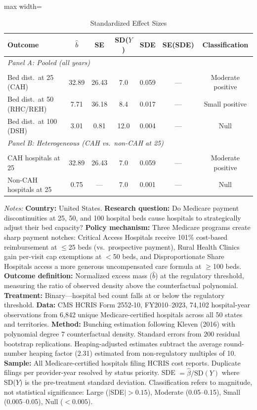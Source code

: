 \begin{table}[htbp]
\centering
\caption{Standardized Effect Sizes}
\label{tab:sde}
\begin{adjustbox}{max width=\textwidth}
\begin{tabular}{lcccccc}
\hline\hline
Outcome & $\hat{b}$ & SE & SD($Y$) & SDE & SE(SDE) & Classification \\
\hline
\multicolumn{7}{l}{\textit{Panel A: Pooled (all years)}} \\ &  &  &  &  &  &  \\
Bed dist.\ at 25 (CAH) & 32.89 & 26.43 & 7.0 & 0.059 & --- & Moderate positive \\
Bed dist.\ at 50 (RHC/REH) & 7.71 & 36.18 & 8.4 & 0.017 & --- & Small positive \\
Bed dist.\ at 100 (DSH) & 3.01 & 0.81 & 12.0 & 0.004 & --- & Null \\
\multicolumn{7}{l}{\textit{Panel B: Heterogeneous (CAH vs.\ non-CAH at 25)}} \\ &  &  &  &  &  &  \\
CAH hospitals at 25 & 32.89 & 26.43 & 7.0 & 0.059 & --- & Moderate positive \\
Non-CAH hospitals at 25 & 0.75 & --- & 7.0 & 0.001 & --- & Null \\
\hline\hline
\end{tabular}
\end{adjustbox}
\begin{tablenotes}
\small
\item \textit{Notes:} \textbf{Country:} United States. \textbf{Research question:} Do Medicare payment discontinuities at 25, 50, and 100 hospital beds cause hospitals to strategically adjust their bed capacity? \textbf{Policy mechanism:} Three Medicare programs create sharp payment notches: Critical Access Hospitals receive 101\% cost-based reimbursement at $\leq$25 beds (vs.\ prospective payment), Rural Health Clinics gain per-visit cap exemptions at $<$50 beds, and Disproportionate Share Hospitals access a more generous uncompensated care formula at $\geq$100 beds. \textbf{Outcome definition:} Normalized excess mass ($\hat{b}$) at the regulatory threshold, measuring the ratio of observed density above the counterfactual polynomial. \textbf{Treatment:} Binary---hospital bed count falls at or below the regulatory threshold. \textbf{Data:} CMS HCRIS Form 2552-10, FY2010--2023, 74,102 hospital-year observations from 6,842 unique Medicare-certified hospitals across all 50 states and territories. \textbf{Method:} Bunching estimation following Kleven (2016) with polynomial degree 7 counterfactual density. Standard errors from 200 residual bootstrap replications. Heaping-adjusted estimates subtract the average round-number heaping factor (2.31) estimated from non-regulatory multiples of 10. \textbf{Sample:} All Medicare-certified hospitals filing HCRIS cost reports. Duplicate filings per provider-year resolved by status priority. SDE $= \hat{\beta} / \text{SD}(Y)$ where SD($Y$) is the pre-treatment standard deviation. Classification refers to magnitude, not statistical significance: Large ($|$SDE$| > 0.15$), Moderate (0.05--0.15), Small (0.005--0.05), Null ($< 0.005$).
\end{tablenotes}
\end{table}

